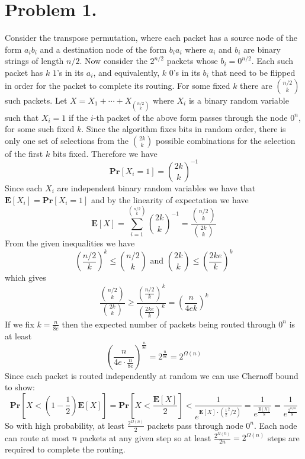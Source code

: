 \documentclass[12pt]{article}
\begin{document}
\section*{Problem 1.}
Consider the transpose permutation, where each packet has a source node of
the form $a_ib_i$ and a destination node of the form $b_ia_i$ where $a_i$
and $b_i$ are binary strings of length $n/2$. Now consider the
$2^{n/2}$ packets whose $b_i = 0^{n/2}$. Each such packet has $k$ $1$'s in its
$a_i$, and equivalently, $k$ $0$'s in its $b_i$ that need to be flipped in order
for the packet to complete its routing. For some fixed $k$ there are
${n/2 \choose k}$ such packets. Let $X = X_1 + \cdots + X_{{n/2 \choose k}}$
where $X_i$ is a binary random variable such that $X_i = 1$ if the $i$-th
packet of the above form passes through the node $0^n$, for some such fixed $k$.
Since the algorithm fixes bits in random order, there is only one set of
selections from the ${2k \choose k}$ possible combinations for the selection of the first $k$ bits
fixed. Therefore we have
$$\textbf{Pr}[X_i = 1] = {2k \choose k}^{-1}$$
Since each $X_i$ are independent binary random variables we have that
$\textbf{E}[X_i] = \textbf{Pr}[X_i = 1]$ and by the linearity of expectation
we have
$$\textbf{E}[X] = \sum_{i=1}^{{n/2 \choose k}} {2k \choose k}^{-1} =
\frac{{n/2 \choose k}}{{2k \choose k}}$$
From the given inequalities we have
$$\left(\frac{n/2}{k}\right)^k \le {n/2 \choose k} \text{ and }
{2k \choose k} \le \left(\frac{2ke}{k}\right)^k$$
which gives
$$\frac{{n/2 \choose k}}{{2k \choose k}} \ge
\frac{\left(\frac{n/2}{k}\right)^k}{\left(\frac{2ke}{k}\right)^k} =
\left(\frac{n}{4ek}\right)^k$$
If we fix $k = \frac{n}{8e}$ then the expected number of packets being routed
through $0^n$ is at least
$$\left(\frac{n}{4e\cdot \frac{n}{8e}}\right)^{\frac{n}{8e}} =
2^{\frac{n}{8e}} = 2^{\Omega(n)}$$
Since each packet is routed independently at random we can use Chernoff bound to
show:
$$\textbf{Pr}[X < (1-\frac{1}{2})\textbf{E}[X]] =
\textbf{Pr}[X < \frac{\textbf{E}[X]}{2}] <
\frac{1}{e^{\textbf{E}[X]\cdot(\frac{1}{2}^2/2)}} =
\frac{1}{e^{\frac{\textbf{E}[X]}{8}}} =
\frac{1}{e^{\frac{2^{n/8e}}{8}}}
$$
So with high probability, at least $\frac{2^{\Omega(n)}}{2}$ packets pass
through node $0^n$. Each node can route at most $n$ packets at any given step so
at least $\frac{2^{\Omega(n)}}{2n} = 2^{\Omega(n)}$ steps are required to
complete the routing.
\end{document}
